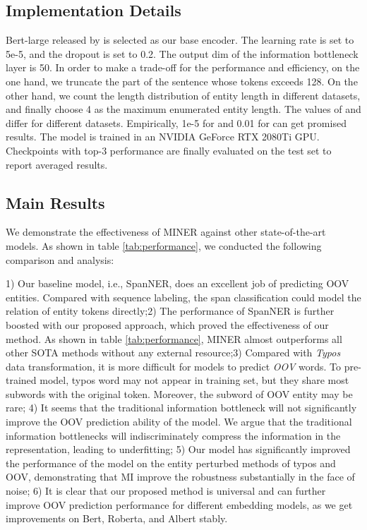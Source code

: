 \documentclass[11pt]{article}
\begin{document}
\subsection{Implementation Details}
Bert-large released by \citet{devlin2018bert} is selected as our base encoder. The learning rate is set to 5e-5, and the dropout is set to 0.2. The output dim of the information bottleneck layer is 50. In order to make a trade-off for the performance and efficiency, on the one hand, we truncate the part of the sentence whose tokens exceeds 128. On the other hand, we count the length distribution of entity length in different datasets, and finally choose 4 as the maximum enumerated entity length. The values of  and  differ for different datasets. Empirically, 1e-5 for  and 0.01 for  can get promised results. The model is trained in an NVIDIA GeForce RTX 2080Ti GPU. Checkpoints with top-3 performance are finally evaluated on the test set to report averaged results.


\subsection{Main Results}
We demonstrate the effectiveness of MINER against other state-of-the-art models. As shown in table \ref{tab:performance}, we conducted the following comparison and analysis:



1) Our baseline model, i.e., SpanNER, does an excellent job of predicting OOV entities. Compared with sequence labeling, the span classification could model the relation of entity tokens directly;2) The performance of SpanNER is further boosted with our proposed approach, which proved the effectiveness of our method. As shown in table \ref{tab:performance}, MINER almost outperforms all other SOTA methods without any external resource;3) Compared with \textit{Typos} data transformation, it is more difficult for models to predict \textit{OOV} words. To pre-trained model, typos word may not appear in training set, but they share most subwords with the original token. Moreover, the subword of OOV entity may be rare; 4) It seems that the traditional information bottleneck will not significantly improve the OOV prediction ability of the model. We argue that the traditional information bottlenecks will indiscriminately compress the information in the representation, leading to underfitting; 5) Our model has significantly improved the performance of the model on the entity perturbed methods of typos and OOV, demonstrating that MI improve the robustness substantially in the face of noise; 
6) It is clear that our proposed method is universal and can further improve OOV prediction performance for different embedding models, as we get improvements on Bert, Roberta, and Albert stably.
\end{document}
